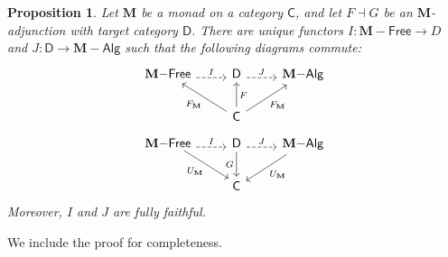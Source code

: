 \documentclass{article}
\newtheorem{prop}{Proposition}
\theoremstyle{definition}
\newcommand{\C}{\mathsf{C}}
\newcommand{\D}{\mathsf{D}}
\newcommand{\M}{\mathbf{M}}
\newcommand{\Alg}{\mathsf{Alg}}
\newcommand{\Free}{\mathsf{Free}}
\begin{document}
\begin{prop}
Let $\M$ be a monad on a category $\C$, and let $F \dashv G$ be an $\M$-adjunction with target category $\D$. There are unique functors $I : \M{-}\Free \to D$ and $J : \D \to \M{-}\Alg$ such that the following diagrams commute:
\[\begin{tikzcd}[ampersand replacement=\&]
    {\M{-}\Free} \& \D \& {\M{-}\Alg} \\
    \& \C
    \arrow["{F_{\M}}", from=2-2, to=1-1]
    \arrow["F"', from=2-2, to=1-2]
    \arrow["{F_{\M}}"', from=2-2, to=1-3]
    \arrow["I", shift right=1, dashed, from=1-1, to=1-2]
    \arrow["J", shift right=1, dashed, from=1-2, to=1-3]
\end{tikzcd}\]
\[\begin{tikzcd}[ampersand replacement=\&]
    {\M{-}\Free} \& \D \& {\M{-}\Alg} \\
    \& \C
    \arrow["I", shift right=1, dashed, from=1-1, to=1-2]
    \arrow["J", shift right=1, dashed, from=1-2, to=1-3]
    \arrow["{U_{\M}}"', shift left=1, from=1-1, to=2-2]
    \arrow["G"', from=1-2, to=2-2]
    \arrow["{U_{\M}}", from=1-3, to=2-2]
\end{tikzcd}\]
Moreover, $I$ and $J$ are fully faithful.
\end{prop}
We include the proof for completeness.
\end{document}

